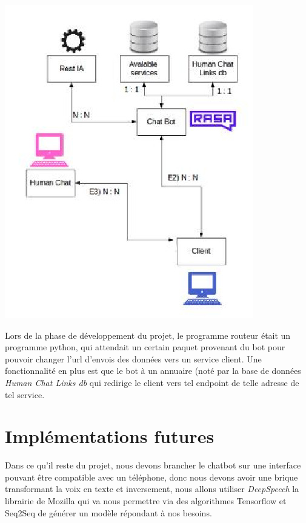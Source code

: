 \begin{center}
\includegraphics[scale=0.9]{img/plans.jpg}
\end{center}

Lors de la phase de développement du projet, le programme routeur était un programme python, qui attendait un certain paquet provenant du bot pour pouvoir changer l'url d’envois des données vers un service client. Une fonctionnalité en plus est que le bot à un annuaire (noté par la base de données \textit{Human Chat Links db} qui redirige le client vers tel endpoint de telle adresse de tel service.\linebreak

\section{Implémentations futures}

Dans ce qu'il reste du projet, nous devons brancher le chatbot sur une interface pouvant être compatible avec un téléphone, donc nous devons avoir une brique transformant la voix en texte et inversement, nous allons utiliser \textit{DeepSpeech} la librairie de Mozilla qui va nous permettre via des algorithmes Tensorflow et Seq2Seq de générer un modèle répondant à nos besoins.\linebreak

